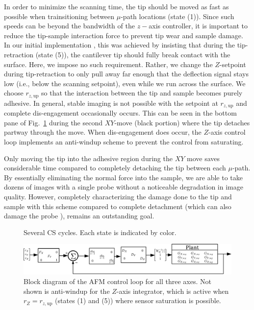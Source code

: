 \documentclass[journal]{IEEEtran}
\newcommand{\rzup}{\ensuremath{r_{z,\textrm{up}}}\xspace}
\begin{document}
In order to minimize the scanning time, the tip should be moved as fast as possible when trainsitioning between $\mu$-path locations (state (1)). Since such speeds can be beyond the bandwidth of the $z-$axis controller, it is important to reduce the tip-sample interaction force to prevent tip wear and sample damage. In our initial implementation \cite{braker_hardware_2018}, 
this was achieved by insisting that during the
tip-retraction (state (5)), the cantilever tip should fully break
contact with the surface. Here, we impose no such requirement. Rather,
we change the $Z$-setpoint during tip-retraction to only pull away far
enough that the deflection signal stays low (i.e., below the scanning
setpoint), even while we run across the surface. We choose \rzup so
that the interaction between the tip and sample becomes purely
adhesive. In general, stable imaging is not possible with the setpoint at \rzup and
complete dis-engagement occasionally occurs. This can be seen in the bottom pane of
Fig.~\ref{fig:cs_cycle} during the second $XY$-move (black portion) where the tip detaches partway through the move. When dis-engagement does occur, the $Z$-axis control loop implements an anti-windup scheme to prevent the control from saturating.


Only moving the tip into the adhesive region during the $XY$ move saves considerable time
compared to completely detaching the tip between each $\mu$-path. By essentially eliminating the normal force into the sample, we are able to take dozens of images with a single probe without a noticeable degradation in image quality.
However, completely characterizing the damage done to the tip and sample with this scheme compared to complete detachment (which can also damage the probe \cite{meyer_atomic_1992}), remains an outstanding goal.

\begin{figure}[t!]
  \centering 
  \caption{Several CS cycles. Each state is indicated by color.}
  \label{fig:cs_cycle}
\end{figure}

\begin{figure}[ht!]
  \centering
  \includegraphics[width=1\textwidth]{figures/AFM_loop_xyz.pdf}
  \caption{Block diagram of the AFM control loop for all three axes.
    Not shown is anti-windup for the $Z$-axis integrator, which is active
    when $r_Z=\rzup$ (states (1) and (5)) where sensor saturation is possible.}
  \label{fig:afm_bd_dinv}
\end{figure}
\end{document}
